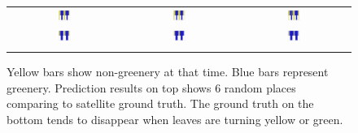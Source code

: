 \begin{figure}
\begin{center}
\begin{tabular}{ccc}
\includegraphics[width=0.14\textwidth]{bar/8560.jpg} &
\includegraphics[width=0.14\textwidth]{bar/8561.jpg} &
\includegraphics[width=0.14\textwidth]{bar/8881.jpg} \\
\includegraphics[width=0.14\textwidth]{bar/8911.jpg} &
\includegraphics[width=0.14\textwidth]{bar/9705.jpg} &
\includegraphics[width=0.14\textwidth]{bar/10816.jpg} \\
\\
\end{tabular}
\end{center}
\vspace{-24pt}
\caption{Yellow bars show non-greenery at that time. Blue bars represent greenery. Prediction results on top shows 6 random places comparing to satellite ground truth. The ground truth on the bottom tends to disappear when leaves are turning yellow or green.}
\label{fig:placeinbar}
\vspace{-12pt}
\end{figure}

